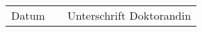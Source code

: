 \vspace{2\baselineskip}

\begin{table}[h!]
	\begin{tabular}{lcr}
			\cline{1-1} \cline{3-3}
    		Datum  \hfill &\hspace{0.6\textwidth} & Unterschrift Doktorandin

	\end{tabular}
\end{table}


